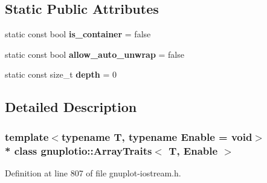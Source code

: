 \subsection*{Static Public Attributes}
\begin{DoxyCompactItemize}
\item 
static const bool {\bfseries is\+\_\+container} = false\hypertarget{classgnuplotio_1_1_array_traits_ac5d19b25086565613c305960bd9d4a78}{}\label{classgnuplotio_1_1_array_traits_ac5d19b25086565613c305960bd9d4a78}

\item 
static const bool {\bfseries allow\+\_\+auto\+\_\+unwrap} = false\hypertarget{classgnuplotio_1_1_array_traits_a354d64663551a34c36c5fa7823859668}{}\label{classgnuplotio_1_1_array_traits_a354d64663551a34c36c5fa7823859668}

\item 
static const size\+\_\+t {\bfseries depth} = 0\hypertarget{classgnuplotio_1_1_array_traits_a6fbd8c815e595f4efbcafd9b0eeb06f2}{}\label{classgnuplotio_1_1_array_traits_a6fbd8c815e595f4efbcafd9b0eeb06f2}

\end{DoxyCompactItemize}


\subsection{Detailed Description}
\subsubsection*{template$<$typename T, typename Enable = void$>$\\*
class gnuplotio\+::\+Array\+Traits$<$ T, Enable $>$}



Definition at line 807 of file gnuplot-\/iostream.\+h.

